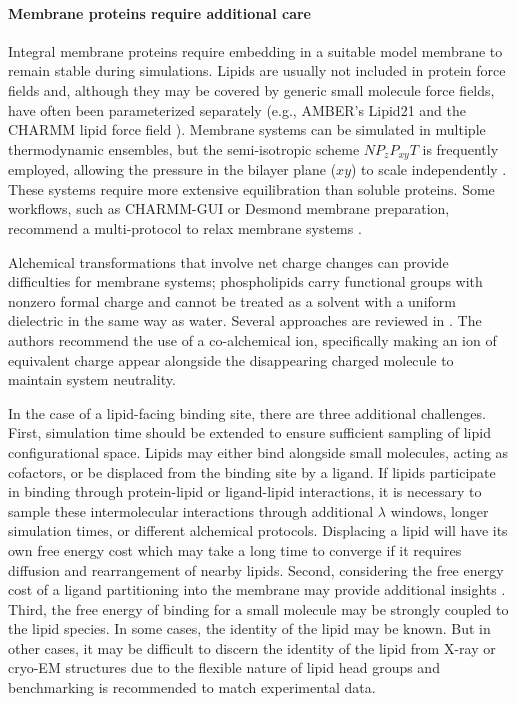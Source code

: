 \documentclass[9pt,bestpractices]{livecoms}
\begin{document}
\paragraph{Membrane proteins require additional care}
Integral membrane proteins require embedding in a suitable model membrane to remain stable during simulations. Lipids are usually not included in protein force fields and, although they may be covered by generic small molecule force fields, have often been parameterized separately (e.g., AMBER's Lipid21 \cite{AMBERLipid21} and the CHARMM lipid force field \cite{CHARMMLipidFF}). Membrane systems can be simulated in multiple thermodynamic ensembles, but the semi-isotropic scheme $NP_{z}P_{xy}T$ is frequently employed, allowing the pressure in the bilayer plane ($xy$) to scale independently \cite{LipidBestPracticesCOMS}. These systems require more extensive equilibration than soluble proteins. Some workflows, such as CHARMM-GUI or Desmond membrane preparation, recommend a multi-protocol to relax membrane systems \cite{https://doi.org/10.1002/jcc.23702,DesmondManual}. 

Alchemical transformations that involve net charge changes can provide difficulties for membrane systems; phospholipids carry functional groups with nonzero formal charge and cannot be treated as a solvent with a uniform dielectric in the same way as water. Several approaches are reviewed in \cite{wu2022correction-51c}. The authors recommend the use of a co-alchemical ion, specifically making an ion of equivalent charge appear alongside the disappearing charged molecule to maintain system neutrality.

In the case of a lipid-facing binding site, there are three additional challenges. First, simulation time should be extended to ensure sufficient sampling of lipid configurational space. Lipids may either bind alongside small molecules, acting as cofactors, or be displaced from the binding site by a ligand. If lipids participate in binding through protein-lipid or ligand-lipid interactions, it is necessary to sample these intermolecular interactions through additional $\lambda$ windows, longer simulation times, or different alchemical protocols. Displacing a lipid will have its own free energy cost which may take a long time to converge if it requires diffusion and rearrangement of nearby lipids. Second, considering the free energy cost of a ligand partitioning into the membrane may provide additional insights \cite{doi:10.1021/acs.jcim.1c01147}. Third, the free energy of binding for a small molecule may be strongly coupled to the lipid species. In some cases, the identity of the lipid may be known. But in other cases, it may be difficult to discern the identity of the lipid from X-ray or cryo-EM structures due to the flexible nature of lipid head groups and benchmarking is recommended to match experimental data.
\end{document}
